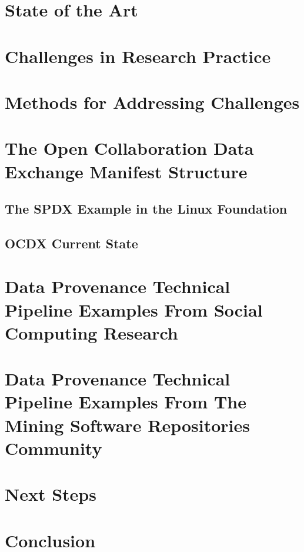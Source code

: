 \section{State of the Art}

\section{Challenges in Research Practice}

\section{Methods for Addressing Challenges}

\section{The Open Collaboration Data Exchange Manifest Structure}
\subsection{The SPDX Example in the Linux Foundation}
\subsection{OCDX Current State}

\section{Data Provenance Technical Pipeline Examples From Social Computing Research}

\section{Data Provenance Technical Pipeline Examples From The Mining Software Repositories Community}


\section{Next Steps}

\section{Conclusion}